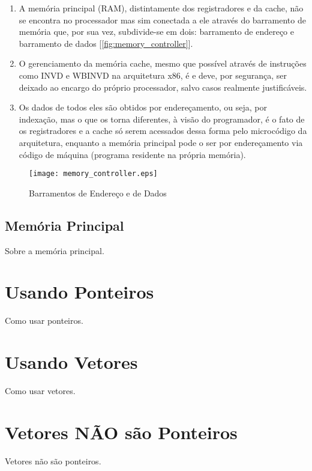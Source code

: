 \begin{enumerate}
\item A memória principal (RAM), distintamente dos registradores e da cache, não se encontra no processador mas sim conectada a ele através do barramento de memória que, por sua vez, subdivide-se em dois: barramento de endereço e barramento de dados [\autoref{fig:memory_controller}].
\item O gerenciamento da memória cache, mesmo que possível através de instruções como INVD e WBINVD na arquitetura x86, é e deve, por segurança, ser deixado ao encargo do próprio processador, salvo casos realmente justificáveis.
\item Os dados de todos eles são obtidos por endereçamento, ou seja, por indexação, mas o que os torna diferentes, à visão do programador, é o fato de os registradores e a cache só serem acessados dessa forma pelo microcódigo da arquitetura, enquanto a memória principal pode o ser por endereçamento via código de máquina (programa residente na própria memória).
\end{enumerate}

\begin{figure}[!htp]
  \centering
  \texttt{[image: memory\_controller.eps]}
  \caption{Barramentos de Endereço e de Dados}
 \label{fig:memory_controller}
\end{figure}


\subsection{Memória Principal}

Sobre a memória principal.


\section{Usando Ponteiros}

Como usar ponteiros.


\section{Usando Vetores}

Como usar vetores.


\section{Vetores NÃO são Ponteiros}

Vetores não são ponteiros.